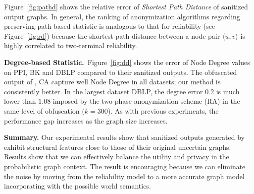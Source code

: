 Figure~\ref{fig:pathd} shows the relative error of \emph{Shortest Path Distance} of sanitized output graphs. In general, the ranking of anonymization algorithms regarding preserving path-based statistic is analogous to that for reliability (see Figure~\ref{fig:rd}) because the shortest path distance between a node pair $\langle u,v\rangle$ is highly correlated to two-terminal reliability. 



\textbf{Degree-based Statistic.}~Figure~\ref{fig:dd} shows the error of Node Degree values on PPI, BK and DBLP compared to their sanitized outputs. 
The obfuscated output of {\methodName}, CA capture well Node Degree in all datasets; 
our method {\methodName} is consistently better.    
In the largest dataset DBLP, the degree error $0.2$ is much lower than $1.08$ imposed by the two-phase anonymization scheme (RA) in the same level of obfuscation ($k=300$).  
As with previous experiments, the performance gap increases as the graph size increases.

\textbf{Summary.} 
Our experimental results show that sanitized outputs generated by {\methodName} exhibit structural features close to those of their original uncertain graphs. 
Results show that we can effectively balance the utility and privacy in the probabilistic graph context.
The result is encouraging because we can eliminate the noise by moving from the reliability model to a more accurate graph model incorporating with the possible world semantics.
